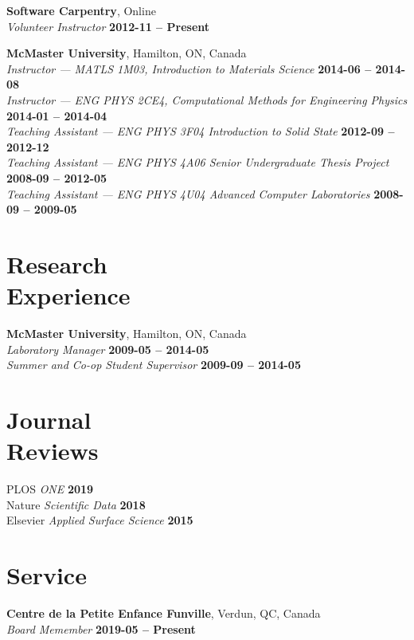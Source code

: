 \documentclass[margin1,line,canadian]{resume}
\begin{document}
\begin{resume}
 \textbf{Software Carpentry}, Online\\%
 \textsl{Volunteer Instructor} \hfill \textbf{2012-11 -- Present}

 \vspace{-2mm}
 \textbf{McMaster University}, Hamilton, ON, Canada \\%
 \textsl{Instructor --- MATLS 1M03, Introduction to Materials Science} \hfill \textbf{2014-06 -- 2014-08}\\
 \textsl{Instructor --- ENG PHYS 2CE4, Computational Methods for Engineering Physics} \hfill \textbf{2014-01 -- 2014-04}\\
 \textsl{Teaching Assistant --- ENG PHYS 3F04 Introduction to Solid State} \hfill \textbf{2012-09 -- 2012-12}\\
 \textsl{Teaching Assistant --- ENG PHYS 4A06 Senior Undergraduate Thesis Project} \hfill  \textbf{2008-09 -- 2012-05}\\
 \textsl{Teaching Assistant --- ENG PHYS 4U04 Advanced Computer Laboratories} \hfill \textbf{2008-09 -- 2009-05}

 \section{\mysidestyle Research\\Experience}
 \textbf{McMaster University}, Hamilton, ON, Canada\\%
 \textsl{Laboratory Manager} \hfill \textbf{2009-05 -- 2014-05}\\
 \textsl{Summer and Co-op Student Supervisor} \hfill \textbf{2009-09 -- 2014-05}\\

 \section{\mysidestyle Journal\\Reviews}
 PLOS \textsl{ONE} \hfill \textbf{2019}\\
 Nature \textsl{Scientific Data} \hfill \textbf{2018}\\
 Elsevier \textsl{Applied Surface Science} \hfill \textbf{2015}\\

\section{\mysidestyle Service}
\textbf{Centre de la Petite Enfance Funville}, Verdun, QC, Canada\\%
\textsl{Board Memember} \hfill \textbf{2019-05 -- Present}


\end{resume}
\end{document}
